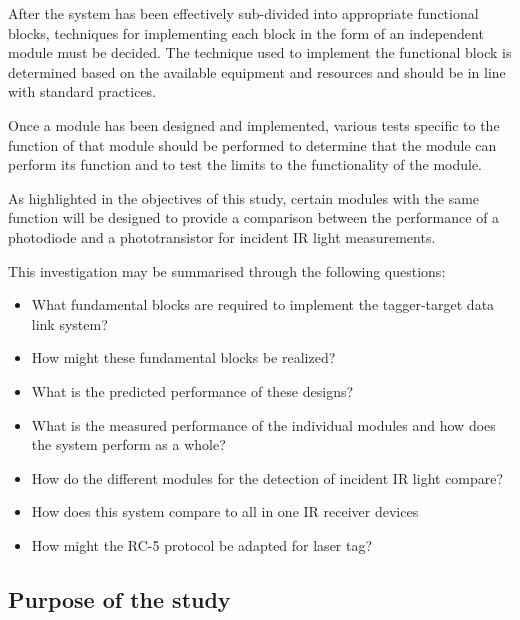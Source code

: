 After the system has been effectively sub-divided into appropriate functional blocks, techniques for implementing each block in the form of an independent module must be decided. The technique used to implement the functional block is determined based on the available equipment and resources and should be in line with standard practices.

Once a module has been designed and implemented, various tests specific to the function of that module should be performed to determine that the module can perform its function and to test the limits to the functionality of the module.

As highlighted in the objectives of this study, certain modules with the same function will be designed to provide a comparison between the performance of a photodiode and a phototransistor for incident IR light measurements.

This investigation may be summarised through the following questions:

\begin{itemize}
	\item What fundamental blocks are required to implement the tagger-target data link system?
	\item How might these fundamental blocks be realized?
	\item What is the predicted performance of these designs?
	\item What is the measured performance of the individual modules and how does the system perform as a whole?
	\item How do the different modules for the detection of incident IR light compare?
	\item How does this system compare to all in one IR receiver devices
	\item How might the RC-5 protocol be adapted for laser tag?
	
\end{itemize}


\subsection{Purpose of the study}

